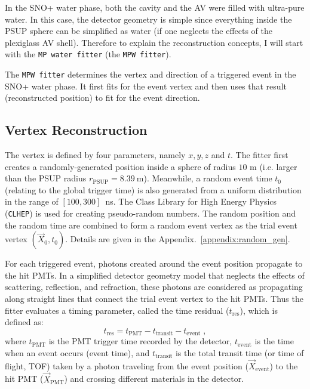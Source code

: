 In the SNO+ water phase, both the cavity and the AV were filled with ultra-pure water. In this case, the detector geometry is simple since everything inside the PSUP sphere can be simplified as water (if one neglects the effects of the plexiglass AV shell). Therefore to explain the reconstruction concepts, I will start with the \texttt{MP water fitter} (the \texttt{MPW fitter}).

The \texttt{MPW fitter} determines the vertex and direction of a triggered event in the SNO+ water phase. It first fits for the event vertex and then uses that result (reconstructed position) to fit for the event direction.

\subsection{Vertex Reconstruction}\label{sect:waterVertex}

The vertex is defined by four parameters, namely $x,y,z$ and $t$. The fitter first creates a randomly-generated position inside a sphere of radius $10$ m (i.e. larger than the PSUP radius $r_{\mathrm{PSUP}}=8.39~$m). Meanwhile, a random event time $t_0$ (relating to the global trigger time) is also generated from a uniform distribution in the range of $[100,300]$~ns. The Class Library for High Energy Physics (\texttt{CLHEP}) is used for creating pseudo-random numbers. The random position and the random time are combined to form a random event vertex as the trial event vertex $(\vec{X}_0,t_0)$. Details are given in the Appendix.~\ref{appendix:random_gen}.

For each triggered event, photons created around the event position propagate to the hit PMTs. In a simplified detector geometry model that neglects the effects of scattering, reflection, and refraction, these photons are considered as propagating along straight lines that connect the trial event vertex to the hit PMTs. Thus the fitter evaluates a timing parameter, called the time residual ($t_\mathrm{res}$), which is defined as:
\begin{equation}
\label{eq:tres_define}
t_\mathrm{res}=t_\mathrm{PMT} - t_{\mathrm{transit}} - t_{\mathrm{event}}\;,
\end{equation}
where $t_\mathrm{PMT}$ is the PMT trigger time recorded by the detector, $t_{\mathrm{event}}$ is the time when an event occurs (event time), and $t_{\mathrm{transit}}$ is the total transit time (or time of flight, TOF) taken by a photon traveling from the event position ($\vec{X}_{\mathrm{event}}$) to the hit PMT ($\vec{X}_{\mathrm{PMT}}$) and crossing different materials in the detector.

